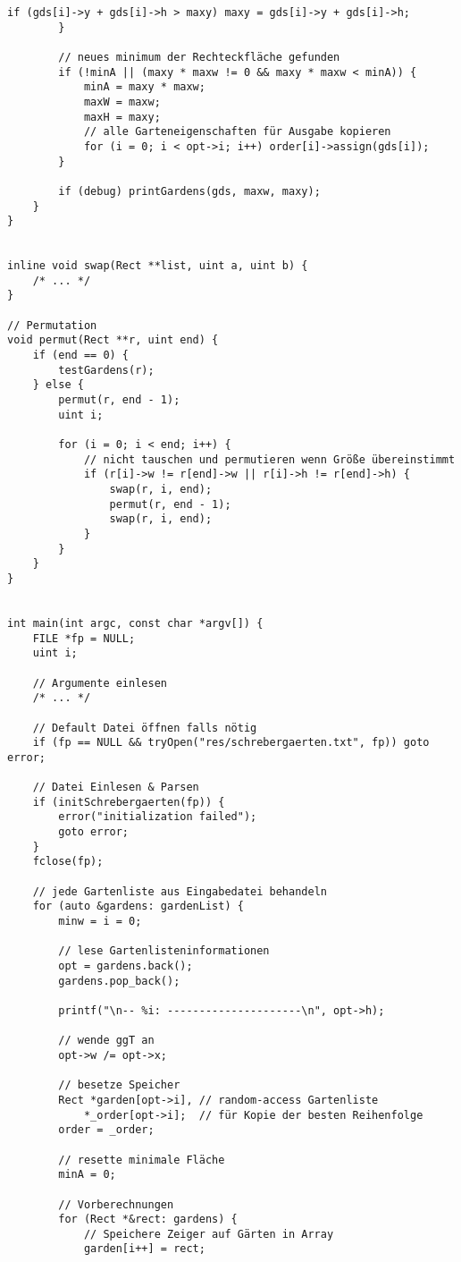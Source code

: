 \documentclass[a4paper,10pt,ngerman]{scrartcl}
\begin{document}
\begin{lstlisting}[frame=single]
            if (gds[i]->y + gds[i]->h > maxy) maxy = gds[i]->y + gds[i]->h;
        }

        // neues minimum der Rechteckfläche gefunden
        if (!minA || (maxy * maxw != 0 && maxy * maxw < minA)) {
            minA = maxy * maxw;
            maxW = maxw;
            maxH = maxy;
            // alle Garteneigenschaften für Ausgabe kopieren
            for (i = 0; i < opt->i; i++) order[i]->assign(gds[i]);
        }

        if (debug) printGardens(gds, maxw, maxy);
    }
}


inline void swap(Rect **list, uint a, uint b) {
    /* ... */
}

// Permutation
void permut(Rect **r, uint end) {
    if (end == 0) {
        testGardens(r);
    } else {
        permut(r, end - 1);
        uint i;

        for (i = 0; i < end; i++) {
            // nicht tauschen und permutieren wenn Größe übereinstimmt
            if (r[i]->w != r[end]->w || r[i]->h != r[end]->h) {
                swap(r, i, end);
                permut(r, end - 1);
                swap(r, i, end);
            }
        }
    }
}


int main(int argc, const char *argv[]) {
    FILE *fp = NULL;
    uint i;

    // Argumente einlesen
    /* ... */

    // Default Datei öffnen falls nötig
    if (fp == NULL && tryOpen("res/schrebergaerten.txt", fp)) goto error;

    // Datei Einlesen & Parsen
    if (initSchrebergaerten(fp)) {
        error("initialization failed");
        goto error;
    }
    fclose(fp);

    // jede Gartenliste aus Eingabedatei behandeln
    for (auto &gardens: gardenList) {
        minw = i = 0;

        // lese Gartenlisteninformationen
        opt = gardens.back();
        gardens.pop_back();

        printf("\n-- %i: ---------------------\n", opt->h);

        // wende ggT an
        opt->w /= opt->x;

        // besetze Speicher
        Rect *garden[opt->i], // random-access Gartenliste
            *_order[opt->i];  // für Kopie der besten Reihenfolge
        order = _order;

        // resette minimale Fläche
        minA = 0;

        // Vorberechnungen
        for (Rect *&rect: gardens) {
            // Speichere Zeiger auf Gärten in Array
            garden[i++] = rect;


\end{lstlisting}
\end{document}
